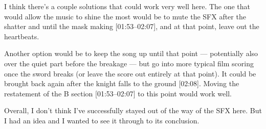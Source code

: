 I think there's a couple solutions that could work very well here. The one that would allow the music to shine the most would be to mute the SFX after the shatter and until the mask making [01:53--02:07], and at that point, leave out the heartbeats.

Another option would be to keep the song up until that point --- potentially also over the quiet part before the breakage --- but go into more typical film scoring once the sword breaks (or leave the score out entirely at that point). It could be brought back again after the knight falls to the ground [02:08]. Moving the restatement of the B section [01:53--02:07] to this point would work well.

Overall, I don't think I've successfully stayed out of the way of the SFX here. But I had an idea and I wanted to see it through to its conclusion.
